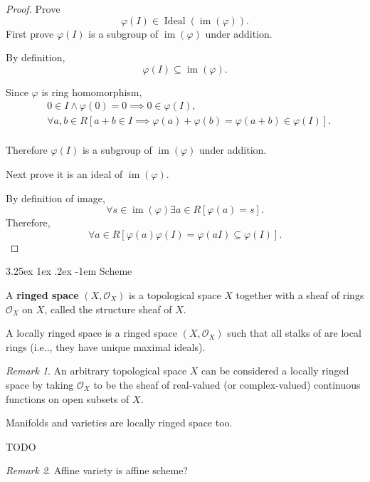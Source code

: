 \documentclass[12pt, letterpaper]{article}
\makeatletter
\renewcommand\subparagraph{\@startsection{subparagraph}{5}{\parindent}%
	{3.25ex \@plus1ex \@minus .2ex}%
	{0.75ex plus 0.1ex}%
	{\normalfont\normalsize\bfseries}}
\newcommand\ie{i.e\@ifnextchar.{}{.\@}}
\newcommand{\red}[1]{{\color{red} #1}}
\renewcommand\subparagraph{\@startsection{subparagraph}{5}{\parindent}%
	{3.25ex \@plus1ex \@minus .2ex}%
	{-1em}%
	{\normalfont\normalsize\bfseries}}
\theoremstyle{definition}
\theoremstyle{remark}
\newtheorem*{rem*}{Remark}
\theoremstyle{definition}
\theoremstyle{plain}
\numberwithin{equation}{section}
\makeatother
\begin{document}
	\begin{proof}
		Prove \[ \varphi(I)\in\operatorname{Ideal}(\operatorname{im}(\varphi)).\]
		First prove $\varphi(I)$ is a subgroup of $\operatorname{im}(\varphi)$ under addition.
		
		By definition,
		\[ \varphi(I)\subseteq\operatorname{im}(\varphi) .\]
		
		Since $\varphi$ is ring homomorphism,
		\[\begin{aligned}
			&0\in I\land \varphi(0)=0\implies 0\in\varphi(I),\\
			&\forall a,b\in R [a+b\in I \implies \varphi(a)+\varphi(b)=\varphi(a+b)\in\varphi(I) ].\\
		\end{aligned}  \]
	
		Therefore $\varphi(I)$ is a subgroup of $\operatorname{im}(\varphi)$ under addition.
		
		Next prove it is an ideal of $\operatorname{im}(\varphi)$.
		
		By definition of image,
		\[ \forall s\in\operatorname{im}(\varphi)\exists a\in R[\varphi(a)=s].  \]
		Therefore,
		\[ \forall a\in R[\varphi(a)\varphi(I)=\varphi(aI)\subseteq \varphi(I) ]. \]
		
	\end{proof}
	
	\subparagraph{Scheme}
	\begin{def*}
		A \textbf{ringed space} $(X,{\mathcal {O}}_{X})$ is a topological space $X$
		together with a sheaf of rings ${\mathcal {O}}_{X}$ on $X$,
		called the structure sheaf of $X$.
	\end{def*}
	
	\begin{def*}
		A locally ringed space is a ringed space $(X,{\mathcal  {O}}_{X})$ such that all stalks of 
		are local rings (\ie, they have unique maximal ideals).
	\end{def*}
	\begin{rem*}
		An arbitrary topological space $X$ can be considered a locally ringed space by taking ${\mathcal {O}}_{X}$ to be the sheaf of real-valued (or complex-valued) continuous functions on open subsets of $X$.
		
		Manifolds and varieties are locally ringed space too.
	\end{rem*}

	\begin{def*}
		\red{TODO}
	\end{def*}
	\begin{rem*}
		\red{Affine variety is affine scheme?}
	\end{rem*}
	
\end{document}
